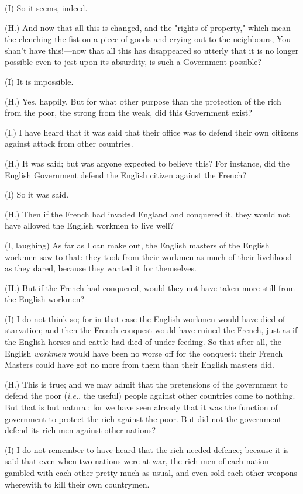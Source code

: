 (I) So it seems, indeed.

(H.) And now that all this is changed, and the "rights of property,"
which mean the clenching the fist on a piece of goods and crying out to
the neighbours, You shan't have this!---now that all this has
disappeared so utterly that it is no longer possible even to jest upon
its absurdity, is such a Government possible?

(I) It is impossible.

(H.) Yes, happily. But for what other purpose than the protection of the
rich from the poor, the strong from the weak, did this Government exist?

(I.) I have heard that it was said that their office was to defend their
own citizens against attack from other countries.

(H.) It was said; but was anyone expected to believe this? For instance,
did the English Government defend the English citizen against the
French?

(I) So it was said.

(H.) Then if the French had invaded England and conquered it, they would
not have allowed the English workmen to live well?

(I, laughing) As far as I can make out, the English masters of the
English workmen saw to that: they took from their workmen as much of
their livelihood as they dared, because they wanted it for themselves.

(H.) But if the French had conquered, would they not have taken more
still from the English workmen?

(I) I do not think so; for in that case the English workmen would have
died of starvation; and then the French conquest would have ruined the
French, just as if the English horses and cattle had died of
under-feeding. So that after all, the English \emph{workmen} would have
been no worse off for the conquest: their French Masters could have got
no more from them than their English masters did.

(H.) This is true; and we may admit that the pretensions of the
government to defend the poor (\emph{i.e.}, the useful) people against
other countries come to nothing. But that is but natural; for we have
seen already that it was the function of government to protect the rich
against the poor. But did not the government defend its rich men against
other nations?

(I) I do not remember to have heard that the rich needed defence;
because it is said that even when two nations were at war, the rich men
of each nation gambled with each other pretty much as usual, and even
sold each other weapons wherewith to kill their own countrymen.

